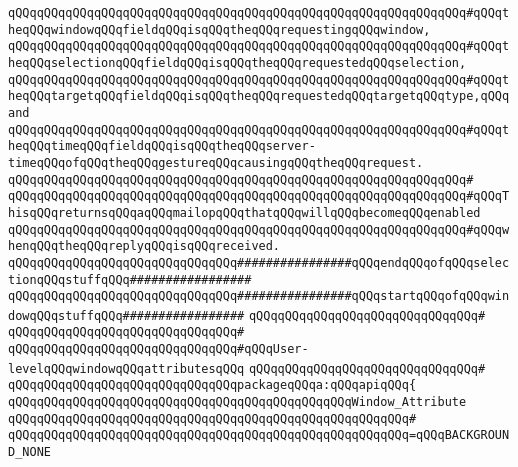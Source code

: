 \verb|qQQqqQQqqQQqqQQqqQQqqQQqqQQqqQQqqQQqqQQqqQQqqQQqqQQqqQQqqQQqqQQq#qQQqtheqQQqwindowqQQqfieldqQQqisqQQqtheqQQqrequestingqQQqwindow,|\newline
\verb|qQQqqQQqqQQqqQQqqQQqqQQqqQQqqQQqqQQqqQQqqQQqqQQqqQQqqQQqqQQqqQQq#qQQqtheqQQqselectionqQQqfieldqQQqisqQQqtheqQQqrequestedqQQqselection,|\newline
\verb|qQQqqQQqqQQqqQQqqQQqqQQqqQQqqQQqqQQqqQQqqQQqqQQqqQQqqQQqqQQqqQQq#qQQqtheqQQqtargetqQQqfieldqQQqisqQQqtheqQQqrequestedqQQqtargetqQQqtype,qQQqand|\newline
\verb|qQQqqQQqqQQqqQQqqQQqqQQqqQQqqQQqqQQqqQQqqQQqqQQqqQQqqQQqqQQqqQQq#qQQqtheqQQqtimeqQQqfieldqQQqisqQQqtheqQQqserver-timeqQQqofqQQqtheqQQqgestureqQQqcausingqQQqtheqQQqrequest.|\newline
\verb|qQQqqQQqqQQqqQQqqQQqqQQqqQQqqQQqqQQqqQQqqQQqqQQqqQQqqQQqqQQqqQQq#|\newline
\verb|qQQqqQQqqQQqqQQqqQQqqQQqqQQqqQQqqQQqqQQqqQQqqQQqqQQqqQQqqQQqqQQq#qQQqThisqQQqreturnsqQQqaqQQqmailopqQQqthatqQQqwillqQQqbecomeqQQqenabled|\newline
\verb|qQQqqQQqqQQqqQQqqQQqqQQqqQQqqQQqqQQqqQQqqQQqqQQqqQQqqQQqqQQqqQQq#qQQqwhenqQQqtheqQQqreplyqQQqisqQQqreceived.|\newline
\newline
\verb|qQQqqQQqqQQqqQQqqQQqqQQqqQQqqQQq################qQQqendqQQqofqQQqselectionqQQqstuffqQQq#################|\newline
\newline
\newline
\newline
\verb|qQQqqQQqqQQqqQQqqQQqqQQqqQQqqQQq################qQQqstartqQQqofqQQqwindowqQQqstuffqQQq#################|\newline
\verb|qQQqqQQqqQQqqQQqqQQqqQQqqQQqqQQq#|\newline
\verb|qQQqqQQqqQQqqQQqqQQqqQQqqQQqqQQq#|\newline
\newline
\verb|qQQqqQQqqQQqqQQqqQQqqQQqqQQqqQQq#qQQqUser-levelqQQqwindowqQQqattributesqQQq|\newline
\verb|qQQqqQQqqQQqqQQqqQQqqQQqqQQqqQQq#|\newline
\verb|qQQqqQQqqQQqqQQqqQQqqQQqqQQqqQQqpackageqQQqa:qQQqapiqQQq{|\newline
\verb|qQQqqQQqqQQqqQQqqQQqqQQqqQQqqQQqqQQqqQQqqQQqqQQqWindow_Attribute|\newline
\verb|qQQqqQQqqQQqqQQqqQQqqQQqqQQqqQQqqQQqqQQqqQQqqQQqqQQqqQQq#|\newline
\verb|qQQqqQQqqQQqqQQqqQQqqQQqqQQqqQQqqQQqqQQqqQQqqQQqqQQqqQQq=qQQqBACKGROUND_NONE|\newline
